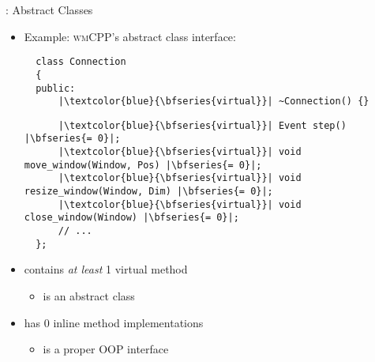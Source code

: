 \begin{frame}[fragile]{\underline{\cpp}: Abstract Classes \hfill {\footnotesize \currentname}}


    \begin{itemize}

        \item Example: \textsc{wmCPP}'s  abstract class interface:\\[3pt]
\begin{verbatim}
  class Connection
  {
  public:
      |\textcolor{blue}{\bfseries{virtual}}| ~Connection() {}
\end{verbatim}
\begin{verbatim}
      |\textcolor{blue}{\bfseries{virtual}}| Event step() |\bfseries{= 0}|;
      |\textcolor{blue}{\bfseries{virtual}}| void move_window(Window, Pos) |\bfseries{= 0}|;
      |\textcolor{blue}{\bfseries{virtual}}| void resize_window(Window, Dim) |\bfseries{= 0}|;
      |\textcolor{blue}{\bfseries{virtual}}| void close_window(Window) |\bfseries{= 0}|;
      // ...
  };
\end{verbatim}

        \item {} contains \textit{at least} 1 virtual method
            \begin{itemize}
                \item {} is an abstract class
            \end{itemize}

        \item {} has 0 inline method implementations
            \begin{itemize}
                \item {} is a proper OOP interface
            \end{itemize}

    \end{itemize}

    \vfill

\end{frame}

